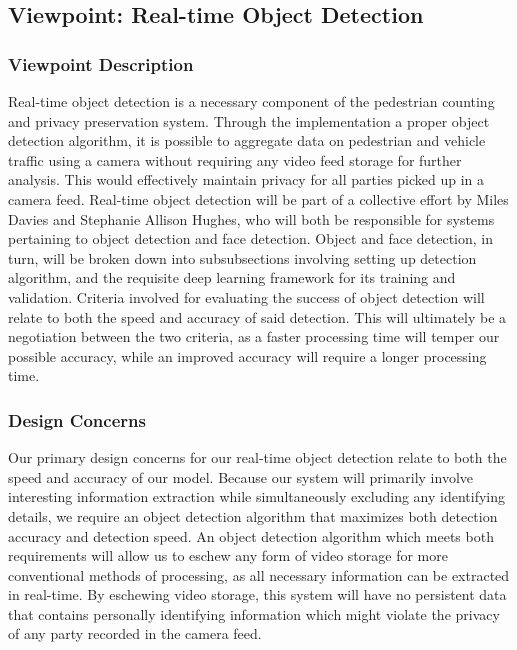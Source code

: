 \subsection{Viewpoint: Real-time Object Detection}

\subsubsection{Viewpoint Description}

Real-time object detection is a necessary component of the pedestrian counting and privacy preservation system. Through the implementation a proper object detection algorithm, it is possible to aggregate data on pedestrian and vehicle traffic using a camera without requiring any video feed storage for further analysis. This would effectively maintain privacy for all parties picked up in a camera feed. Real-time object detection will be part of a collective effort by Miles Davies and Stephanie Allison Hughes, who will both be responsible for systems pertaining to object detection and face detection. Object and face detection, in turn, will be broken down into subsubsections involving setting up detection algorithm, and the requisite deep learning framework for its training and validation. Criteria involved for evaluating the success of object detection will relate to both the speed and accuracy of said detection. This will ultimately be a negotiation between the two criteria, as a faster processing time will temper our possible accuracy, while an improved accuracy will require a longer processing time.

\subsubsection{Design Concerns}

Our primary design concerns for our real-time object detection relate to both the speed and accuracy of our model. Because our system will primarily involve interesting information extraction while simultaneously excluding any identifying details, we require an object detection algorithm that maximizes both detection accuracy and detection speed. An object detection algorithm which meets both requirements will allow us to eschew any form of video storage for more conventional methods of processing, as all necessary information can be extracted in real-time. By eschewing video storage, this system will have no persistent data that contains personally identifying information which might violate the privacy of any party recorded in the camera feed.

